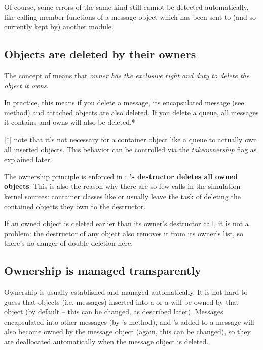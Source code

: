 Of course, some errors of the same kind still cannot be detected
automatically, like calling member functions of a message object
which has been sent to (and so currently kept by) another module.


\subsection{Objects are deleted by their owners}

The concept of  means that \textit{owner has the
exclusive right and duty to delete the object it owns}.

In practice, this means if you delete a message, its encapsulated
message (see  method) and attached
 objects are also deleted. If you delete a queue,
all messages it contains and owns will also be deleted.*

  [*] note that it's not necessary for a container object like
  a queue to actually own all inserted objects. This behavior
  can be controlled via the \textit{takeownership} flag as
  explained later.


The ownership principle is enforced in :
\textbf{'s destructor deletes all owned objects}.
This is also the reason why there are so few  calls
in the simulation kernel sources:
container classes like  or 
usually leave the task of deleting the contained objects they own
to the  destructor.

If an owned object is deleted earlier than its owner's destructor
call, it is not a problem: the destructor of any object also
removes it from its owner's list, so there's no danger of double
deletion here.


\subsection{Ownership is managed transparently}

Ownership is usually established and managed automatically.
It is not hard to guess that objects (i.e. messages) inserted
into a  or a  will be owned by that object
(by default -- this can be changed, as described later).
Messages encapsulated into other messages (by 's
 method), and 's added to a message
will also become owned by the message object (again, this can be
changed), so they are deallocated automatically when the
message object is deleted.


